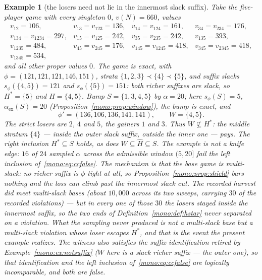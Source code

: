 \documentclass[11pt]{article}
\newtheorem{example}[theorem]{Example}
\begin{document}
\begin{example}[the losers need not lie in the innermost slack suffix]
\label{mono:ex:multislack}
Take the five-player game with every singleton $0$, $v(N)=660$, values
\[
\begin{array}{llll}
 v_{12}=106, & v_{13}=v_{123}=136, & v_{14}=v_{124}=161, & v_{34}=v_{234}=176,\\
 v_{134}=v_{1234}=297, & v_{15}=v_{125}=242, & v_{35}=v_{235}=242, & v_{135}=393,\\
 v_{1235}=484, & v_{45}=v_{245}=176, & v_{145}=v_{1245}=418, & v_{345}=v_{2345}=418,\\
 v_{1345}=534, &&&
\end{array}
\]
and all other proper values $0$.  The game is exact, with
$\phi=(121,121,121,146,151)$, strata $\{1,2,3\}\prec\{4\}\prec\{5\}$, and
suffix slacks $s_\phi(\{4,5\})=121$ and $s_\phi(\{5\})=151$: \emph{both}
richer suffixes are slack, so $H^*=\{5\}$ and $\widehat H=\{4,5\}$.  Bump
$S=\{1,3,4,5\}$ by $\alpha=20$; here $s_\phi(S)=5$,
$\alpha_{\mathrm{ex}}(S)=20$ (Proposition~\ref{mono:prop:window}), the bump
is exact, and
\[
 \phi'=(136,106,136,141,141),\qquad W=\{4,5\}.
\]
The strict losers are $2$, $4$ and $5$, the gainers $1$ and $3$.  Thus
$W\not\subseteq H^*$: the middle stratum $\{4\}$ --- inside the outer slack
suffix, outside the inner one --- pays.  The right inclusion
$H^*\subseteq S$ holds, as does $W\subseteq\widehat H\subseteq S$.  The
example is not a knife edge: $16$ of $24$ sampled $\alpha$ across the
admissible window $(5,20]$ fail the left inclusion of~\eqref{mono:eq:ccfalse}.
The mechanism is that the base game is \emph{multi-slack}: no richer suffix
is $\phi$-tight at all, so Proposition~\ref{mono:prop:shield} bars nothing
and the loss can climb past the innermost slack cut.  The recorded harvest
did meet multi-slack bases (about $10{,}000$ across its two sweeps,
carrying $30$ of the recorded violations) --- but in every one of those
$30$ the losers stayed inside
the \emph{innermost} suffix, so the two ends of
Definition~\ref{mono:def:hstar} never separated on a violation.  What the
sampling never produced is not a multi-slack base but a multi-slack
violation whose loser escapes $H^*$, and that is the event the present
example realizes.  The witness also satisfies the
suffix identification retired by Example~\ref{mono:ex:notsuffix} ($W$ here
\emph{is} a slack richer suffix --- the outer one), so that identification
and the left inclusion of~\eqref{mono:eq:ccfalse} are logically
incomparable, and both are false.
\end{example}
\end{document}
